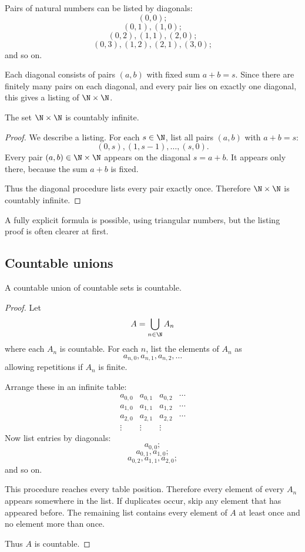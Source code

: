 Pairs of natural numbers can be listed by diagonals:
\[
(0,0);
\]
\[
(0,1),(1,0);
\]
\[
(0,2),(1,1),(2,0);
\]
\[
(0,3),(1,2),(2,1),(3,0);
\]
and so on.

Each diagonal consists of pairs $(a,b)$ with fixed sum $a+b=s$. Since there are finitely many pairs on each diagonal, and every pair lies on exactly one diagonal, this gives a listing of $\N\times\N$.

\begin{theorem}
The set $\N\times\N$ is countably infinite.
\end{theorem}

\begin{proof}
We describe a listing. For each $s\in\N$, list all pairs $(a,b)$ with $a+b=s$:
\[
(0,s),(1,s-1),\ldots,(s,0).
\]
Every pair $(a,b)\in\N\times\N$ appears on the diagonal $s=a+b$. It appears only there, because the sum $a+b$ is fixed.

Thus the diagonal procedure lists every pair exactly once. Therefore $\N\times\N$ is countably infinite.
\end{proof}

A fully explicit formula is possible, using triangular numbers, but the listing proof is often clearer at first.

\subsection{Countable unions}

\begin{theorem}
A countable union of countable sets is countable.
\end{theorem}

\begin{proof}
Let
\[
A=\bigcup_{n\in\N}A_n
\]
where each $A_n$ is countable. For each $n$, list the elements of $A_n$ as
\[
a_{n,0},a_{n,1},a_{n,2},\ldots
\]
allowing repetitions if $A_n$ is finite.

Arrange these in an infinite table:
\[
\begin{array}{cccc}
a_{0,0}&a_{0,1}&a_{0,2}&\cdots\\
a_{1,0}&a_{1,1}&a_{1,2}&\cdots\\
a_{2,0}&a_{2,1}&a_{2,2}&\cdots\\
\vdots&\vdots&\vdots&
\end{array}
\]
Now list entries by diagonals:
\[
a_{0,0};
\]
\[
a_{0,1},a_{1,0};
\]
\[
a_{0,2},a_{1,1},a_{2,0};
\]
and so on.

This procedure reaches every table position. Therefore every element of every $A_n$ appears somewhere in the list. If duplicates occur, skip any element that has appeared before. The remaining list contains every element of $A$ at least once and no element more than once.

Thus $A$ is countable.
\end{proof}


